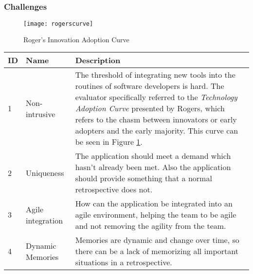 \subsubsection{Challenges}
\begin{figure}[h!]
    \centering
        \texttt{[image: rogerscurve]}
    \caption{Roger's Innovation Adoption Curve}
    \label{rogerscurve}
\end{figure}

\begin{table}[H]
    \begin{tabularx}{\textwidth}{|l|l|X|}
    \hline
    ID & Name                & Description                                                                                                                                                                                                                                                                                                                                                    \\ \hline
    1  & Non-intrusive       & The threshold of integrating new tools into the routines of software developers is hard. The evaluator specifically referred to the \emph{Technology Adoption Curve} presented by Rogers\cite{rogers2010diffusion}, which refers to the chasm between innovators or early adopters and the early majority. This curve can be seen in Figure \ref{rogerscurve}. \\ \hline
    2  & Uniqueness          & The application should meet a demand which hasn't already been met. Also the application should provide something that a normal retrospective does not.                                                                                                                                                                                                        \\ \hline
    3  & Agile integration   & How can the application be integrated into an agile environment, helping the team to be agile and not removing the agility from the team.                                                                                                                                                                                                                      \\ \hline
    4  & Dynamic Memories    & Memories are dynamic and change over time, so there can be a lack of memorizing all important situations in a retrospective.                                                                                                                                                                                                                                   \\ \hline

\end{tabularx}
\end{table}
